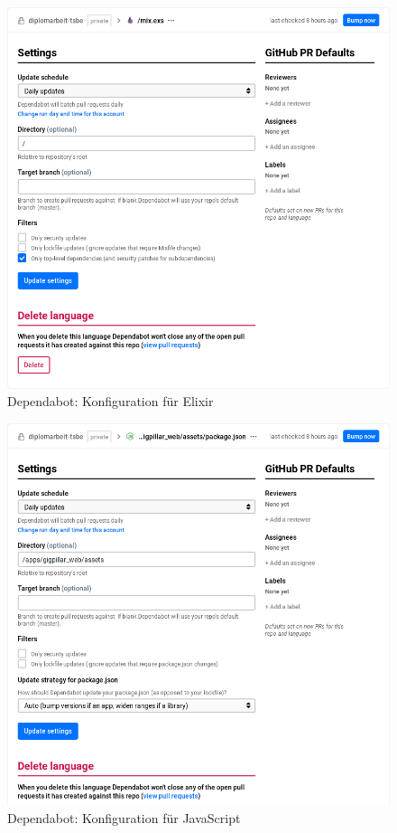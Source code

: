 \begin{figure}[!htb]
  \centering
  \includegraphics[width=1\textwidth]{realisierung/install-dependabot-2-cropped.png}
  \caption{Dependabot: Konfiguration für Elixir}
\end{figure}

\begin{figure}[!htb]
  \centering
  \includegraphics[width=1\textwidth]{realisierung/install-dependabot-3-cropped.png}
  \caption{Dependabot: Konfiguration für JavaScript}
\end{figure}

